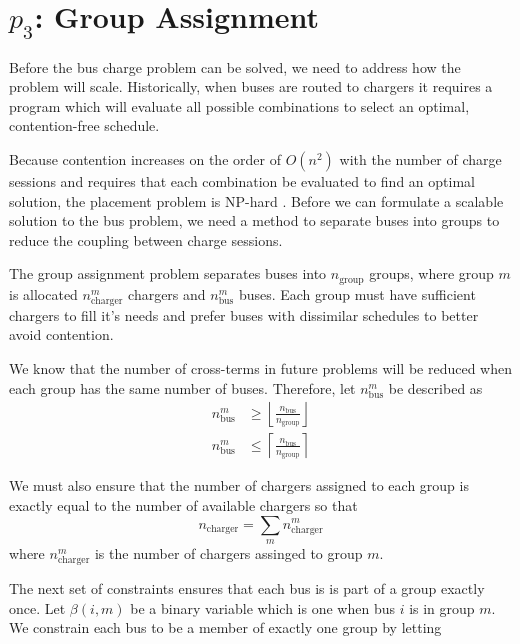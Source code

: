 \section{$p_3$: Group Assignment\label{sec:groupAssignment}}
Before the bus charge problem can be solved, we need to address how the problem will scale. Historically, when buses are routed to chargers it requires a program which will evaluate all possible combinations to select an optimal, contention-free schedule. 
\par Because contention increases on the order of $O(n^2)$ with the number of charge sessions and requires that each combination be evaluated to find an optimal solution, the placement problem is NP-hard \cite{kolesar_branch_1967}. Before we can formulate a scalable solution to the bus problem, we need a method to separate buses into groups to reduce the coupling between charge sessions.
\par The group assignment problem separates buses into $n_{\text{group}}$ groups, where group $m$ is allocated $n^m_{\text{charger}}$ chargers and $n^m_{\text{bus}}$ buses. Each group must have sufficient chargers to fill it's needs and prefer buses with dissimilar schedules to better avoid contention. 
\par We know that the number of cross-terms in future problems will be reduced when each group has the same number of buses. Therefore, let $n^m_{\text{bus}}$ be described as
\begin{equation}\label{eqn:groups:nBusPerGroup}\begin{aligned}
	n^m_{\text{bus}} &\ge \left \lfloor \frac{n_{\text{bus}}}{n_{\text{group}}} \right \rfloor \\
	n^m_{\text{bus}} &\le \left \lceil \frac{n_{\text{bus}}}{n_{\text{group}}} \right \rceil
\end{aligned}\end{equation}
\par We must also ensure that the number of chargers assigned to each group is exactly equal to the number of available chargers so that
\begin{equation}\label{eqn:groups:nTotalCharger}
	n_{\text{charger}} = \sum_mn_{\text{charger}}^m
\end{equation}
where $n_{\text{charger}}^m$ is the number of chargers assinged to group $m$.
\par The next set of constraints ensures that each bus is is part of a group exactly once. Let $\beta(i,m)$ be a binary variable which is one when bus $i$ is in group $m$. We constrain each bus to be a member of exactly one group by letting
